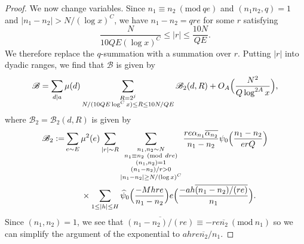 \documentclass[10pt]{amsart}
\theoremstyle{plain}
\numberwithin{equation}{section}
\newcommand{\Mod}[1]{\ (\mathrm{mod}\ #1)}
\renewcommand{\hat}[1]{\widehat #1}
\begin{document}
\begin{proof}
We now change variables. Since $n_1\equiv n_2\Mod{q e}$ and $(n_1n_2,q)=1$ and $|n_1-n_2|>N/(\log{x})^C$, we have $n_1-n_2=q r e$ for some $r$ satisfying
\[
\frac{N}{10 QE(\log{x})^C}\le |r|\le \frac{10 N}{QE}.
\]
We therefore replace the $q$-summation with a summation over $r$. Putting $|r|$ into dyadic ranges, we find that $\mathscr{B}$ is given by
\begin{equation}
\mathscr{B}=\sum_{d|a}\mu(d)\sum_{\substack{R=2^j\\ N/(10QE\log^C{x})\le R\le 10N/QE}}\mathscr{B}_2(d,R)+O_{A}\Bigl(\frac{N^2}{Q\log^{2A}{x}}\Bigr),
\end{equation}
where $\mathscr{B}_2=\mathscr{B}_2(d,R)$ is given by
\begin{align*}
\mathscr{B}_2:=&\sum_{e\sim E}\mu^2(e)\sum_{|r| \sim R}\sum_{\substack{n_1,n_2\sim N\\ n_1\equiv n_2\Mod{d r e}\\ (n_1,n_2)=1\\ (n_1-n_2)/r>0\\ |n_1-n_2|\ge N/(\log{x})^C}}\frac{r e\alpha_{n_1}\overline{\alpha_{n_2}}}{n_1-n_2}\psi_0\Bigl(\frac{n_1-n_2}{e r Q} \Bigr)\\
&\qquad\times\sum_{1\le |h|\le H}\hat{\psi_0}\Bigl(\frac{-M h r e}{n_1-n_2}\Bigr)e\Bigl(\frac{-ah\overline{(n_1-n_2)/(re)}}{n_1}\Bigr).
\end{align*}
Since $(n_1,n_2)=1$, we see that $\overline{(n_1-n_2)/(re)}\equiv - r e\overline{n_2}\Mod{n_1}$ so we can simplify the argument of the exponential to $ahre\overline{n_2}/n_1$. 


\end{proof}
\end{document}
